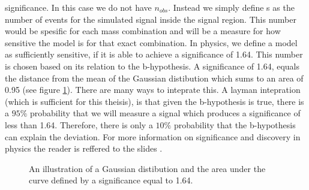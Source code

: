 significance. In this case we do not have $n_{obs}$. Instead we simply define s as the number of events for the simulated signal 
inside the signal region. This number would be spesific for each mass combination and will be a measure for how sensitive 
the model is for that exact combination. In physics, we define a model as sufficiently sensitive, if it is able to achieve a 
significance of 1.64. This number is chosen based on its relation to the b-hypothesis. A significance of 1.64, equals the 
distance from the mean of the Gaussian distibution which sums to an area of 0.95 (see figure \ref{fig:ConfInt}). There are many ways to inteprate this. A layman 
intepration (which is sufficient for this theisis), is that given the b-hypothesis is true, there is a $95\%$ probability that we will 
measure a signal which produces a significance of less than 1.64. Therefore, there is only a $10\%$ probability that the b-hypothesis
can explain the deviation. For more information on significance and discovery in physics the reader is reffered to the slides \cite{magnar}.
\begin{figure}
    \centering
    \caption{An illustration of a Gaussian distibution and the area under the curve defined by a significance equal to 1.64.}
    \label{fig:ConfInt}
\end{figure}
